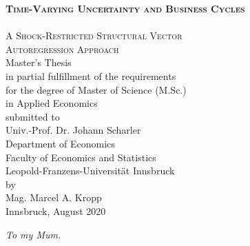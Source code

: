 \documentclass[a4paper,11pt,listof=nochaptergap,oneside,pointednumbers,bibtotoc,bigheadings,liststotoc,hidelinks]{scrbook}
\theoremstyle{mysatz}
\theoremstyle{mydefinition}
\theoremstyle{mytheorem}
\theoremstyle{mybemerkung}
\begin{document}
\begin{titlepage}
\begin{center}
        \Huge{\scshape\bfseries Time-Varying Uncertainty and Business Cycles} \\[-5mm]
        \HRule \\[2mm]
        \Large {\scshape A Shock-Restricted Structural Vector \\
        				Autoregression Approach} \\[10mm]
        \Large Master's Thesis \\[10mm]
        \Large in partial fulfillment of the requirements \\for the degree of Master of Science (M.Sc.)\\
                  in Applied Economics \\[10mm]
                  
        submitted to\\
        Univ.-Prof. Dr. Johann Scharler \\[10mm]
        Department of Economics\\
        Faculty of Economics and Statistics\\
        Leopold-Franzens-Universität Innsbruck \\[10mm]
        by \\ Mag. Marcel A. Kropp \\[10mm]
        Innsbruck, August 2020
    \end{center}
\end{titlepage}

\restoregeometry

\thispagestyle{empty} %
\null{}
    \begin{flushright}
       \large \textit{To my Mum.}\\
    \end{flushright}
\null
\end{document}

